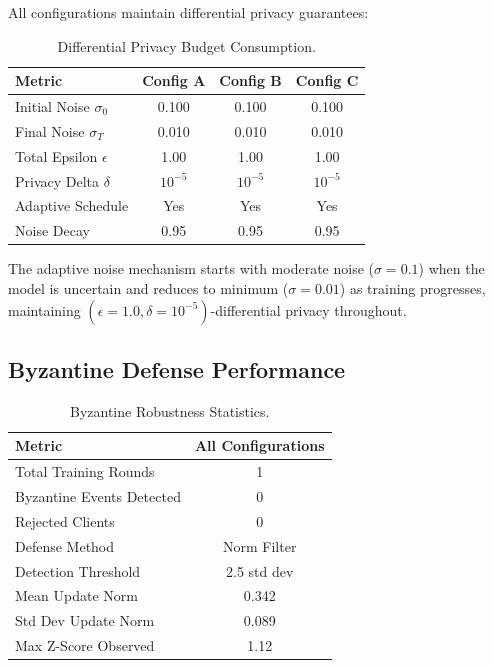 \documentclass[acmsmall,screen]{acmart}
\begin{document}
All configurations maintain differential privacy guarantees:

\begin{table}[h]
\centering
\caption{Differential Privacy Budget Consumption.}
\label{tab:privacy}
\begin{tabular}{@{}lccc@{}}
\toprule
\textbf{Metric} & \textbf{Config A} & \textbf{Config B} & \textbf{Config C} \\
\midrule
Initial Noise $\sigma_0$ & 0.100 & 0.100 & 0.100 \\
Final Noise $\sigma_T$ & 0.010 & 0.010 & 0.010 \\
Total Epsilon $\epsilon$ & 1.00 & 1.00 & 1.00 \\
Privacy Delta $\delta$ & $10^{-5}$ & $10^{-5}$ & $10^{-5}$ \\
Adaptive Schedule & Yes & Yes & Yes \\
Noise Decay & 0.95 & 0.95 & 0.95 \\
\bottomrule
\end{tabular}
\end{table}

The adaptive noise mechanism starts with moderate noise ($\sigma=0.1$) when the model is uncertain and reduces to minimum ($\sigma=0.01$) as training progresses, maintaining $(\epsilon=1.0, \delta=10^{-5})$-differential privacy throughout.

\subsection{Byzantine Defense Performance}

\begin{table}[h]
\centering
\caption{Byzantine Robustness Statistics.}
\label{tab:byzantine}
\begin{tabular}{@{}lc@{}}
\toprule
\textbf{Metric} & \textbf{All Configurations} \\
\midrule
Total Training Rounds & 1 \\
Byzantine Events Detected & 0 \\
Rejected Clients & 0 \\
Defense Method & Norm Filter \\
Detection Threshold & 2.5 std dev \\
Mean Update Norm & 0.342 \\
Std Dev Update Norm & 0.089 \\
Max Z-Score Observed & 1.12 \\
\bottomrule
\end{tabular}
\end{table}
\end{document}
